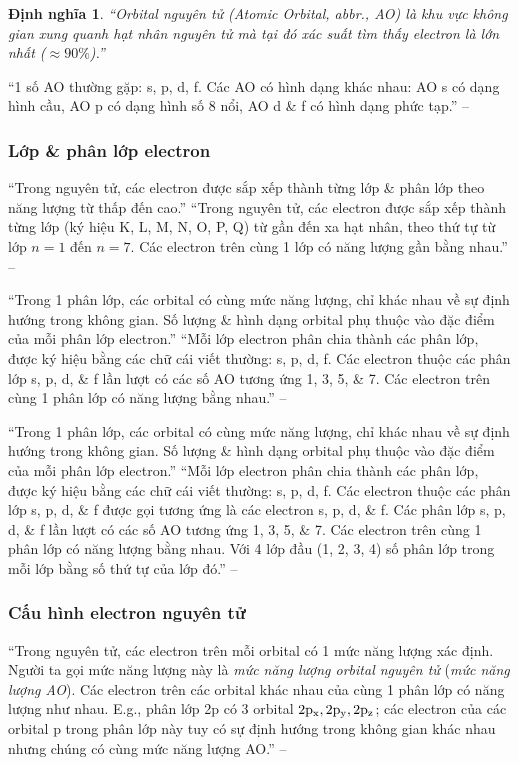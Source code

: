 \documentclass{article}
\numberwithin{equation}{section}
\newtheorem{dinhnghia}{Định nghĩa}[section]
\begin{document}
\begin{dinhnghia}
	``\emph{Orbital nguyên tử} (\emph{Atomic Orbital}, abbr., \emph{AO}) là khu vực không gian xung quanh hạt nhân nguyên tử mà tại đó xác suất tìm thấy electron là lớn nhất ($\approx90\%$).''
\end{dinhnghia}
``1 số AO thường gặp: s, p, d, f. Các AO có hình dạng khác nhau: AO s có dạng hình cầu, AO p có dạng hình số 8 nổi, AO d \& f có hình dạng phức tạp.'' -- \cite[p. 28]{SGK_Hoa_Hoc_10_Chan_Troi_Sang_Tao}

\subsubsection{Lớp \& phân lớp electron}
``Trong nguyên tử, các electron được sắp xếp thành từng lớp \& phân lớp theo năng lượng từ thấp đến cao.'' ``Trong nguyên tử, các electron được sắp xếp thành từng lớp (ký hiệu K, L, M, N, O, P, Q) từ gần đến xa hạt nhân, theo thứ tự từ lớp $n = 1$ đến $n = 7$. Các electron trên cùng 1 lớp có năng lượng gần bằng nhau.'' -- \cite[p. 28]{SGK_Hoa_Hoc_10_Chan_Troi_Sang_Tao}

``Trong 1 phân lớp, các orbital có cùng mức năng lượng, chỉ khác nhau về sự định hướng trong không gian. Số lượng \& hình dạng orbital phụ thuộc vào đặc điểm của mỗi phân lớp electron.'' ``Mỗi lớp electron phân chia thành các phân lớp, được ký hiệu bằng các chữ cái viết thường: s, p, d, f. Các electron thuộc các phân lớp s, p, d, \& f lần lượt có các số AO tương ứng 1, 3, 5, \& 7. Các electron trên cùng 1 phân lớp có năng lượng bằng nhau.'' -- \cite[p. 28]{SGK_Hoa_Hoc_10_Chan_Troi_Sang_Tao}

``Trong 1 phân lớp, các orbital có cùng mức năng lượng, chỉ khác nhau về sự định hướng trong không gian. Số lượng \& hình dạng orbital phụ thuộc vào đặc điểm của mỗi phân lớp electron.'' ``Mỗi lớp electron phân chia thành các phân lớp, được ký hiệu bằng các chữ cái viết thường: s, p, d, f. Các electron thuộc các phân lớp s, p, d, \& f được gọi tương ứng là các electron s, p, d, \& f. Các phân lớp s, p, d, \& f lần lượt có các số AO tương ứng 1, 3, 5, \& 7. Các electron trên cùng 1 phân lớp có năng lượng bằng nhau. Với 4 lớp đầu (1, 2, 3, 4) số phân lớp trong mỗi lớp bằng số thứ tự của lớp đó.'' -- \cite[p. 28]{SGK_Hoa_Hoc_10_Chan_Troi_Sang_Tao}

\subsubsection{Cấu hình electron nguyên tử}
``Trong nguyên tử, các electron trên mỗi orbital có 1 mức năng lượng xác định. Người ta gọi mức năng lượng này là \textit{mức năng lượng orbital nguyên tử} (\textit{mức năng lượng AO}). Các electron trên các orbital khác nhau của cùng 1 phân lớp có năng lượng như nhau. E.g., phân lớp 2p có 3 orbital $\rm 2p_x,2p_y,2p_z$; các electron của các orbital p trong phân lớp này tuy có sự định hướng trong không gian khác nhau nhưng chúng có cùng mức năng lượng AO.'' -- \cite[p. 29]{SGK_Hoa_Hoc_10_Chan_Troi_Sang_Tao}
\end{document}
